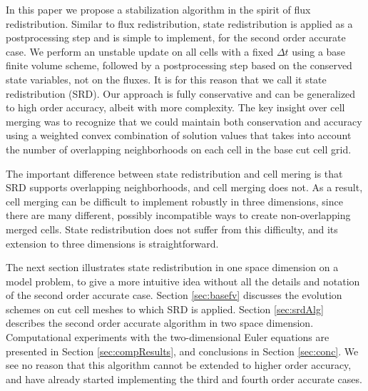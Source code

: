 In this paper we propose a stabilization algorithm in
the spirit of flux redistribution. Similar to flux redistribution, state
redistribution is applied as a postprocessing step and is simple to implement,
for the second order accurate case. We perform an unstable update on all 
cells with a fixed $\Delta t$ using a base finite volume scheme, followed
by a postprocessing step based on the conserved state variables, not on the
fluxes.  It is for this reason that we call it state redistribution
(SRD).  Our
approach is fully conservative and can be generalized to high order accuracy,
albeit with  more complexity. The key insight over cell merging was to
recognize that we could maintain both conservation and accuracy using a
weighted convex combination of solution values that takes into account the 
number of overlapping neighborhoods on each cell in the base cut cell
grid.

The important difference between state redistribution and cell mering is
that SRD supports overlapping neighborhoods, and cell merging does not.
As a result, cell merging can be difficult to implement robustly
in three dimensions, since there are many different, possibly
incompatible ways to create non-overlapping merged cells.  State
redistribution does not suffer from this difficulty, and its extension to
three dimensions is straightforward.

The next section illustrates state redistribution  in one space dimension
on a model problem, to give a more intuitive idea without all the details and 
notation of the second order accurate  case.
Section \ref{sec:basefv} discusses the evolution schemes on cut cell meshes
to which SRD is applied.
Section \ref{sec:srdAlg} describes the second order accurate
algorithm in two space dimension.  Computational experiments with the
two-dimensional Euler equations  are presented in
Section \ref{sec:compResults}, and conclusions in Section \ref{sec:conc}. 
We see no reason that this algorithm cannot be extended to higher order
accuracy, and have already started implementing the third and fourth
order accurate cases.

